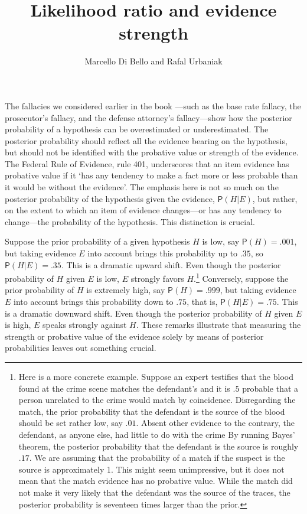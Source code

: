 \documentclass[
  10pt,
  dvipsnames,enabledeprecatedfontcommands]{scrartcl}
\title{Likelihood ratio and evidence strength}
\author{Marcello Di Bello and Rafal Urbaniak}
\date{}
\newcommand{\pr}[1]{\mathsf{P}(#1)}
\begin{document}
\maketitle

The fallacies we considered earlier in the book
---such as the base rate fallacy, the prosecutor's
fallacy, and the defense attorney's fallacy---show how the posterior
probability of a hypothesis can be overestimated or underestimated. The
posterior probability should reflect all the evidence bearing on the
hypothesis, but should not be identified with the probative value or
strength of the evidence. The Federal Rule of Evidence, rule 401,
underscores that an item evidence has probative value if it `has any
tendency to make a fact more or less probable than it would be without
the evidence'. The emphasis here is not so much on the posterior
probability of the hypothesis given the evidence, \(\pr{H \vert E}\),
but rather, on the extent to which an item of evidence changes---or has
any tendency to change---the probability of the hypothesis. This
distinction is crucial.

Suppose the prior probability of a given hypothesis \(H\) is low, say
\(\pr{H}=.001\), but taking evidence \(E\) into account brings this
probability up to \(.35\), so \(\pr{H \vert E}=.35\). This is a dramatic
upward shift. Even though the posterior probability of \(H\) given \(E\)
is low, \(E\) strongly favors \(H\).\footnote{Here is a more concrete
  example. Suppose an expert testifies that the blood found at the crime
  scene matches the defendant's and it is \(.5\) probable that a person
  unrelated to the crime would match by coincidence. Disregarding the
  match, the prior probability that the defendant is the source of the
  blood should be set rather low, say \(.01\). Absent other evidence to
  the contrary, the defendant, as anyone else, had little to do with the
  crime By running Bayes' theorem, the posterior probability that the
  defendant is the source is roughly \(.17\). We are assuming that the
  probability of a match if the suspect is the source is approximately
  1. This might seem unimpressive, but it does not mean that the match
  evidence has no probative value. While the match did not make it very
  likely that the defendant was the source of the traces, the posterior
  probability is seventeen times larger than the prior.} Conversely,
suppose the prior probability of \(H\) is extremely high, say
\(\pr{H}=.999\), but taking evidence \(E\) into account brings this
probability down to \(.75\), that is, \(\pr{H \vert E}=.75\). This is a
dramatic downward shift. Even though the posterior probability of \(H\)
given \(E\) is high, \(E\) speaks strongly against \(H\). These remarks
illustrate that measuring the strength or probative value of the
evidence solely by means of posterior probabilities leaves out something
crucial.
\end{document}
